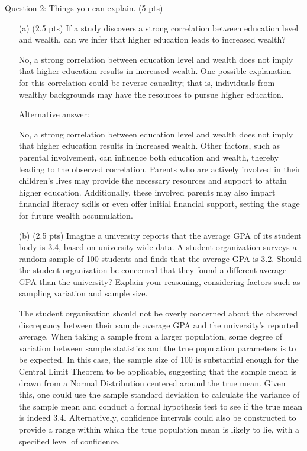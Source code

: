 \documentclass{./../../Latex/tests}
\begin{document}
\newpage
\underline{Question 2: Things you can explain. (5 pts)}
\begin{enumerate}

\item[(a)] (2.5 pts) If a study discovers a strong correlation between education level and wealth, can we infer that higher education leads to increased wealth? 

No, a strong correlation between education level and wealth does not imply that higher education results in increased wealth. One possible explanation for this correlation could be reverse causality;  that is, individuals from wealthy backgrounds may have the resources to pursue higher education.

Alternative answer: 

No, a strong correlation between education level and wealth does not imply that higher education results in increased wealth. Other factors, such as parental involvement, can influence both education and wealth, thereby leading to the observed correlation. Parents who are actively involved in their children's lives may provide the necessary resources and support to attain higher education. Additionally, these involved parents may also impart financial literacy skills or even offer initial financial support, setting the stage for future wealth accumulation.

\item[(b)] (2.5 pts) Imagine a university reports that the average GPA of its student body is 3.4, based on university-wide data. A student organization surveys a random sample of 100 students and finds that the average GPA is 3.2. Should the student organization be concerned that they found a different average GPA than the university? Explain your reasoning, considering factors such as sampling variation and sample size.


The student organization should not be overly concerned about the observed discrepancy between their sample average GPA and the university's reported average. When taking a sample from a larger population, some degree of variation between sample statistics and the true population parameters is to be expected. In this case, the sample size of 100 is substantial enough for the Central Limit Theorem to be applicable, suggesting that the sample mean is drawn from a Normal Distribution centered around the true mean. Given this, one could use the sample standard deviation to calculate the variance of the sample mean and conduct a formal hypothesis test to see if the true mean is indeed 3.4.  Alternatively, confidence intervals could also be constructed to provide a range within which the true population mean is likely to lie, with a specified level of confidence. 
\end{enumerate}
\end{document}
